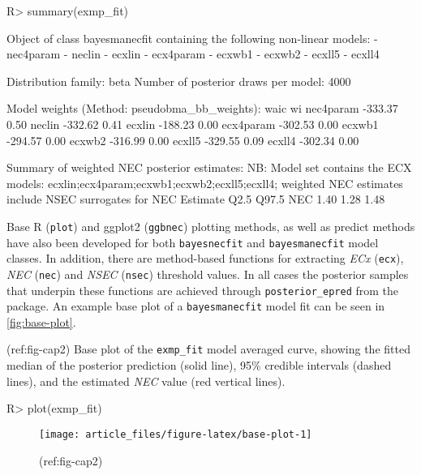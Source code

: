\documentclass[
]{jss}
\begin{document}
\begin{CodeChunk}
\begin{CodeInput}
R> summary(exmp_fit)
\end{CodeInput}
\begin{CodeOutput}
Object of class bayesmanecfit containing the following non-linear models:
  -  nec4param
  -  neclin
  -  ecxlin
  -  ecx4param
  -  ecxwb1
  -  ecxwb2
  -  ecxll5
  -  ecxll4

Distribution family: beta
Number of posterior draws per model:  4000

Model weights (Method: pseudobma_bb_weights):
             waic   wi
nec4param -333.37 0.50
neclin    -332.62 0.41
ecxlin    -188.23 0.00
ecx4param -302.53 0.00
ecxwb1    -294.57 0.00
ecxwb2    -316.99 0.00
ecxll5    -329.55 0.09
ecxll4    -302.34 0.00


Summary of weighted NEC posterior estimates:
NB: Model set contains the ECX models: ecxlin;ecx4param;ecxwb1;ecxwb2;ecxll5;ecxll4; weighted NEC estimates include NSEC surrogates for NEC
    Estimate Q2.5 Q97.5
NEC     1.40 1.28  1.48
\end{CodeOutput}
\end{CodeChunk}

Base R (\texttt{plot}) and ggplot2 (\texttt{ggbnec}) plotting methods,
as well as predict methods have also been developed for both
\texttt{bayesnecfit} and \texttt{bayesmanecfit} model classes. In
addition, there are method-based functions for extracting \emph{ECx}
(\texttt{ecx}), \emph{NEC} (\texttt{nec}) and \emph{NSEC}
(\texttt{nsec}) threshold values. In all cases the posterior samples
that underpin these functions are achieved through
\texttt{posterior\_epred} from the  package. An example base
plot of a \texttt{bayesmanecfit} model fit can be seen in
\autoref{fig:base-plot}.

(ref:fig-cap2) Base plot of the \texttt{exmp\_fit} model averaged curve,
showing the fitted median of the posterior prediction (solid line), 95\%
credible intervals (dashed lines), and the estimated \emph{NEC} value
(red vertical lines).

\begin{CodeChunk}
\begin{CodeInput}
R> plot(exmp_fit)
\end{CodeInput}
\begin{figure}

{\centering \texttt{[image: article\_files/figure-latex/base-plot-1]} 

}

\caption[(ref:fig-cap2)]{(ref:fig-cap2)}\label{fig:base-plot}
\end{figure}
\end{CodeChunk}
\end{document}
